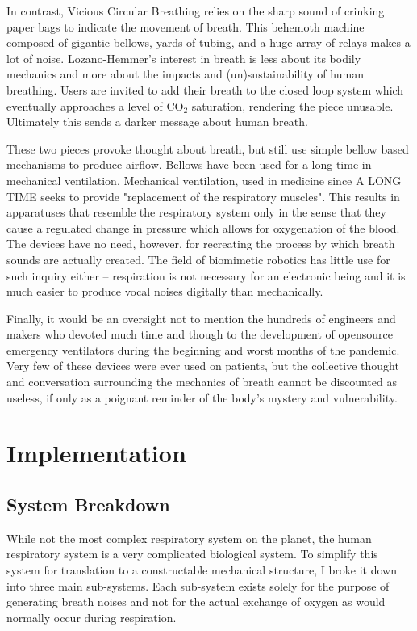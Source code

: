 \documentclass[letterpaper]{article}
\begin{document}
In contrast, Vicious Circular Breathing relies on the sharp sound of crinking paper bags to indicate the movement of breath. This behemoth machine composed of gigantic bellows, yards of tubing, and a huge array of relays makes a lot of noise. Lozano-Hemmer's interest in breath is less about its bodily mechanics and more about the impacts and (un)sustainability of human breathing. Users are invited to add their breath to the closed loop system which eventually approaches a level of CO$_2$ saturation, rendering the piece unusable. Ultimately this sends a darker message about human breath.

These two pieces provoke thought about breath, but still use simple bellow based mechanisms to produce airflow. Bellows have been used for a long time in mechanical ventilation. Mechanical ventilation, used in medicine since A LONG TIME seeks to provide "replacement of the respiratory muscles". \cite{ventilatorhistory} This results in apparatuses that resemble the respiratory system only in the sense that they cause a regulated change in pressure which allows for oxygenation of the blood. The devices have no need, however, for recreating the process by which breath sounds are actually created. The field of biomimetic robotics has little use for such inquiry either -- respiration is not necessary for an electronic being and it is much easier to produce vocal noises digitally than mechanically. 

Finally, it would be an oversight not to mention the hundreds of engineers and makers who devoted much time and though to the development of opensource emergency ventilators during the beginning and worst months of the pandemic. Very few of these devices were ever used on patients, but the collective thought and conversation surrounding the mechanics of breath cannot be discounted as useless, if only as a poignant reminder of the body's mystery and vulnerability. 

\section{Implementation}

\subsection{System Breakdown}

While not the most complex respiratory system on the planet, the human respiratory system is a very complicated biological system. \cite{gasexchangers} To simplify this system for translation to a constructable mechanical structure, I broke it down into three main sub-systems. Each sub-system exists solely for the purpose of generating breath noises and not for the actual exchange of oxygen as would normally occur during respiration.
\end{document}
